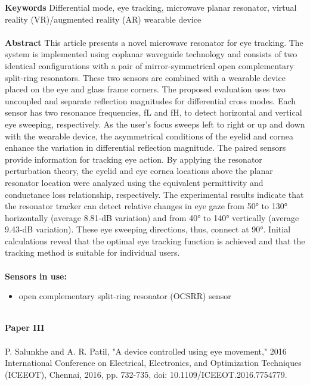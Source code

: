 \noindent
\textbf{Keywords} Differential mode, eye tracking, microwave planar resonator, virtual reality (VR)/augmented reality (AR) wearable device
\\ \\

\noindent
\textbf{Abstract} This article presents a novel microwave resonator for eye tracking. The system is implemented using coplanar waveguide technology and consists of two identical configurations with a pair of mirror-symmetrical open complementary split-ring resonators. These two sensors are combined with a wearable device placed on the eye and glass frame corners. The proposed evaluation uses two uncoupled and separate reflection magnitudes for differential cross modes. Each sensor has two resonance frequencies, fL and fH, to detect horizontal and vertical eye sweeping, respectively. As the user's focus sweeps left to right or up and down with the wearable device, the asymmetrical conditions of the eyelid and cornea enhance the variation in differential reflection magnitude. The paired sensors provide information for tracking eye action. By applying the resonator perturbation theory, the eyelid and eye cornea locations above the planar resonator location were analyzed using the equivalent permittivity and conductance loss relationship, respectively. The experimental results indicate that the resonator tracker can detect relative changes in eye gaze from 50° to 130° horizontally (average 8.81-dB variation) and from 40° to 140° vertically (average 9.43-dB variation). These eye sweeping directions, thus, connect at 90°. Initial calculations reveal that the optimal eye tracking function is achieved and that the tracking method is suitable for individual users.
\\ \\


\noindent
\textbf{Sensors in use:}
\begin{itemize}
    \item open complementary split-ring resonator (OCSRR) sensor \\ \\
\end{itemize}

\noindent
\textbf{Paper III} 
\\ \\
\noindent
P. Salunkhe and A. R. Patil, "A device controlled using eye movement," 2016 International Conference on Electrical, Electronics, and Optimization Techniques (ICEEOT), Chennai, 2016, pp. 732-735, doi: 10.1109/ICEEOT.2016.7754779.\\ \\


